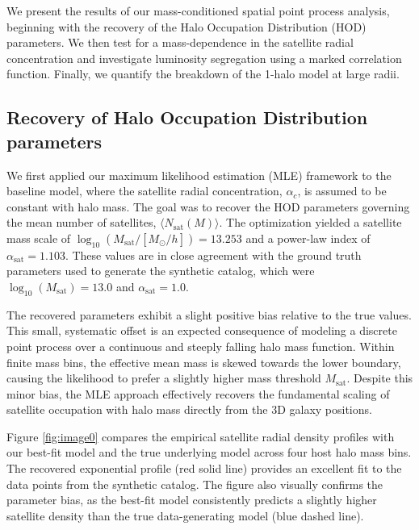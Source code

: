 \documentclass[]{article}
\begin{document}
We present the results of our mass-conditioned spatial point process analysis, beginning with the recovery of the Halo Occupation Distribution (HOD) parameters. We then test for a mass-dependence in the satellite radial concentration and investigate luminosity segregation using a marked correlation function. Finally, we quantify the breakdown of the 1-halo model at large radii.

\subsection{Recovery of Halo Occupation Distribution parameters}
We first applied our maximum likelihood estimation (MLE) framework to the baseline model, where the satellite radial concentration, $\alpha_c$, is assumed to be constant with halo mass. The goal was to recover the HOD parameters governing the mean number of satellites, $\langle N_{\text{sat}}(M) \rangle$. The optimization yielded a satellite mass scale of $\log_{10}(M_{\text{sat}}/[M_\odot/h]) = 13.253$ and a power-law index of $\alpha_{\text{sat}} = 1.103$. These values are in close agreement with the ground truth parameters used to generate the synthetic catalog, which were $\log_{10}(M_{\text{sat}}) = 13.0$ and $\alpha_{\text{sat}} = 1.0$.

The recovered parameters exhibit a slight positive bias relative to the true values. This small, systematic offset is an expected consequence of modeling a discrete point process over a continuous and steeply falling halo mass function. Within finite mass bins, the effective mean mass is skewed towards the lower boundary, causing the likelihood to prefer a slightly higher mass threshold $M_{\text{sat}}$. Despite this minor bias, the MLE approach effectively recovers the fundamental scaling of satellite occupation with halo mass directly from the 3D galaxy positions.

Figure \ref{fig:image0} compares the empirical satellite radial density profiles with our best-fit model and the true underlying model across four host halo mass bins. The recovered exponential profile (red solid line) provides an excellent fit to the data points from the synthetic catalog. The figure also visually confirms the parameter bias, as the best-fit model consistently predicts a slightly higher satellite density than the true data-generating model (blue dashed line).
\end{document}
